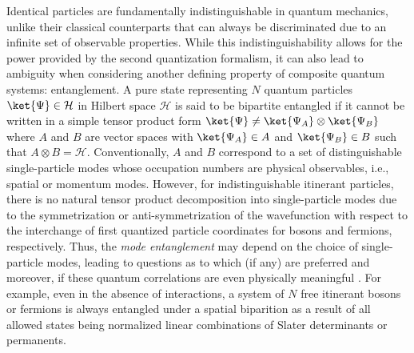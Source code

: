 Identical particles are fundamentally indistinguishable in quantum mechanics,
unlike their classical counterparts that can always be discriminated due to an
infinite set of observable properties. While this indistinguishability allows
for the power provided by the second quantization formalism, it can also lead to
ambiguity \cite{Zanardi:2001ec,Shi:2003jj,Shi:2004fw} when considering another
defining property of composite quantum systems: entanglement.  A pure state
representing $N$ quantum particles $\ket{\Psi} \in \mathcal{H}$ in Hilbert
space $\mathcal{H}$ is said to be bipartite entangled if it cannot be written
in a simple tensor product form $\ket{\Psi} \ne \ket{\Psi_{A}} \otimes
\ket{\Psi_{B}}$ where $A$ and $B$ are vector spaces with
$\ket{\Psi_{A}} \in A$ and $\ket{\Psi_B} \in B$ such that $A
\otimes B = \mathcal{H}$.  Conventionally, $A$ and 
$B$ correspond to a set of distinguishable single-particle modes whose
occupation numbers are physical observables, i.e.,  spatial or momentum modes.
However, for indistinguishable itinerant particles, there is no natural tensor
product decomposition into single-particle modes due to the
symmetrization or anti-symmetrization of the wavefunction with respect to the
interchange of first quantized particle coordinates for bosons and fermions,
respectively.  Thus, the \emph{mode entanglement}
may depend on the choice of single-particle modes, leading to questions as to which
(if any) are preferred and moreover, if these quantum correlations are
even physically meaningful \cite{Ghirardi:2004dl, Barnum:2004bm,
Dunningham:2005fu,Wiseman:2003vn, Wiseman:2003jx,
Benatti:2012cy,Balachandran:2013en, Dalton:2017qe}. For example, even in the absence of
interactions, a system of $N$ free itinerant bosons
\cite{Simon:2002it,Ding:2009gq} or fermions
\cite{Schliemann:2001ea,Zanardi:2002jw,Zanardi:2002gs} is always entangled
under a spatial biparition as a result of all allowed states being normalized
linear combinations of Slater determinants or permanents.


